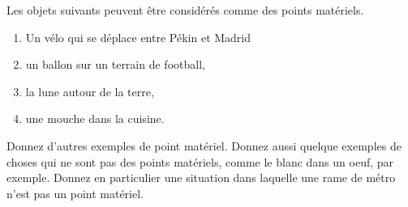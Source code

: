\begin{exemple}
Les objets suivants peuvent être considérés comme des points matériels.
\begin{enumerate}
\item Un vélo qui se déplace entre Pékin et Madrid
\item un ballon sur un terrain de football,
\item la lune autour de la terre,
\item une mouche dans la cuisine.
\end{enumerate}
\end{exemple}

\begin{exercice}
Donnez d'autres exemples de point matériel. Donnez aussi quelque exemples de choses qui ne sont pas des points matériels, comme le blanc dans un oeuf, par exemple. Donnez en particulier une situation dans laquelle une rame de métro n'est pas un point matériel.
\end{exercice}

